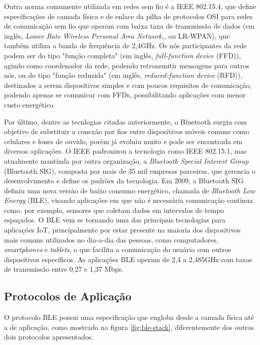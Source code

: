 \documentclass[../monografia.tex]{subfiles}
\begin{document}
Outra norma comumente utilizada em redes sem fio é a IEEE 802.15.4, que define especificações de camada física e de enlace da pilha de protocolos OSI para redes de comunicação sem fio que operam com baixa taxa de transmissão de dados (em inglês, \textit{Lower Rate Wireless Personal Area Network,}, ou LR-WPAN), que também utiliza a banda de frequência de 2,4GHz\cite{802.15.4}. Os nós participantes da rede podem ser do tipo "função completa" (em inglês, \textit{full-function device} (FFD)), agindo como coordenador da rede, podendo retransmitir mensagens para outros nós, ou do tipo "função reduzida" (em inglês, \textit{reduced-function device} (RFD)), destinados a serem dispositivos simples e com poucos requisitos de comunicação, podendo apenas se comunicar com FFDs, possibilitando aplicações com menor custo energético. 

Por último, dentre as tecnlogias citadas anteriormente, o Bluetooth surgiu com objetivo de substituir a conexão por fios entre dispositivos móveis comuns como celulares e fones de ouvido, porém já evoluiu muito e pode ser encontrada em diversas aplicações. O IEEE padronizou a tecnologia como IEEE 802.15.1, mas atualmente mantinda por outra organização, a \textit{Bluetooth Special Interest Group} (Bluetooth SIG), composta por mais de 35 mil empresas parceiras, que gerencia o desenvolvimento e define os padrões da tecnologia. Em 2009, a Bluetooth SIG definiu uma nova versão de baixo consumo energético, chamada de \textit{Bluetooth Low Energy} (BLE), visando aplicações em que não é necessária comunicação contínua como, por exemplo, sensores que coletam dados em intervalos de tempo espaçados. O BLE vem se tornando uma das principais tecnologias para aplicações IoT, principalmente por estar presente na maioria dos dispositivos mais comuns utilizados no dia-a-dia das pessoas, como computadores, \textit{smartphones} e \textit{tablets}, o que facilita a comunicação do usuário com outros dispositivos específicos. As aplicações BLE operam de 2,4 a 2,485GHz com taxas de transmissão entre 0,27 e 1,37 Mbps\cite{ble-datarate}. 

\subsection{Protocolos de Aplicação} \label{protocolos-aplicacao}

O protocolo BLE possui uma especificação que engloba desde a camada física até a de aplicação, como mostrado na figura \ref{fig:ble-stack}, diferentemente dos outros dois protocolos apresentados. 
\end{document}

